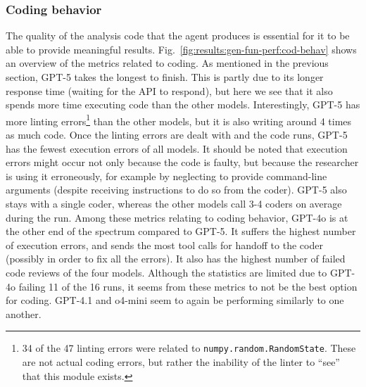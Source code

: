 \documentclass[submission, Phys]{SciPost}
\begin{document}
\subsubsection{Coding behavior}
\label{sec:coding_behavior}
The quality of the analysis code that the agent produces is essential for it to be able to provide meaningful results. Fig.~\ref{fig:results:gen-fun-perf:cod-behav} shows an overview of the metrics related to coding. As mentioned in the previous section, GPT-5 takes the longest to finish. This is partly due to its longer response time (waiting for the API to respond), but here we see that it also spends more time executing code than the other models. Interestingly, GPT-5 has more linting errors\footnote{34 of the 47 linting errors were related to \verb|numpy.random.RandomState|. These are not actual coding errors, but rather the inability of the linter to ``see'' that this module exists.} than the other models, but it is also writing around 4 times as much code. 
Once the linting errors are dealt with and the code runs, GPT-5 has the fewest execution errors of all models. It should be noted that execution errors might occur not only because the code is faulty, but because the researcher is using it erroneously, for example by neglecting to provide command-line arguments (despite receiving instructions to do so from the coder). GPT-5 also stays with a single coder, whereas the other models call 3-4 coders on average during the run. Among these metrics relating to coding behavior, GPT-4o is at the other end of the spectrum compared to GPT-5. It suffers the highest number of execution errors, and sends the most tool calls for handoff to the coder (possibly in order to fix all the errors). It also has the highest number of failed code reviews of the four models. Although the statistics are limited due to GPT-4o failing 11 of the 16 runs, it seems from these metrics to not be the best option for coding.  GPT-4.1 and o4-mini seem to again be performing similarly to one another.
\end{document}
